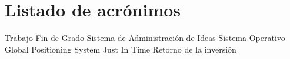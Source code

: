 \chapter{Listado de acrónimos}

{\small
\begin{acronym}[XXXXXXXX]
	 {Trabajo Fin de Grado}
	 {Sistema de Administración de Ideas}
	 {Sistema Operativo}
	 {Global Positioning System}
	 {Just In Time}
	 {Retorno de la inversión}
\end{acronym}
}





